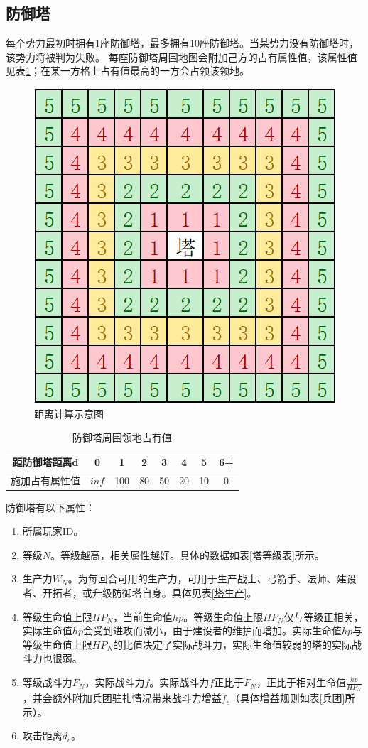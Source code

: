 \documentclass[a4paper,4pt]{article}
\begin{document}
\subsection{防御塔}
每个势力最初时拥有1座防御塔，最多拥有10座防御塔。当某势力没有防御塔时，该势力将被判为失败。
每座防御塔周围地图会附加己方的占有属性值，该属性值见表\ref{领地}；在某一方格上占有值最高的一方会占领该领地。
\begin{figure}[htbp]   %
  \centering
  \includegraphics[width=2.5 in]{距离.png}
  \caption{距离计算示意图}
  \label{jpg:示例图片2}
\end{figure}

\begin{table}[htbp]
  \centering
  \caption{防御塔周围领地占有值}
  \begin{tabular}{c|c|c|c|c|c|c|c}
    \hline
    距防御塔距离d  & 0     & 1   & 2  & 3  & 4  & 5  & 6+ \bigstrut \\
    \hline
    施加占有属性值 & $inf$ & 100 & 80 & 50 & 20 & 10 & 0 \bigstrut  \\
    \hline
  \end{tabular}%
  \label{领地}%
\end{table}%

防御塔有以下属性：
\begin{enumerate}[fullwidth, itemindent=2em, label=(\arabic*)]
  \item 所属玩家ID。
  \item 等级$N$。等级越高，相关属性越好。具体的数据如表\ref{塔等级表}所示。
  \item 生产力$W_N$。为每回合可用的生产力，可用于生产战士、弓箭手、法师、建设者、开拓者，或升级防御塔自身。具体见表\ref{塔生产}。
  \item 等级生命值上限$HP_N$，当前生命值$hp$。等级生命值上限$HP_N$仅与等级正相关，实际生命值$hp$会受到进攻而减小，由于建设者的维护而增加。实际生命值$hp$与等级生命值上限$HP_N$的比值决定了实际战斗力，实际生命值较弱的塔的实际战斗力也很弱。
  \item 等级战斗力$F_N$，实际战斗力$f$。实际战斗力$f$正比于$F_N$，正比于相对生命值$\frac{hp}{HP_N}$，并会额外附加兵团驻扎情况带来战斗力增益$f_c$（具体增益规则如表\ref{兵团}所示）。
  \item 攻击距离$d_c$。
\end{enumerate}
\end{document}

